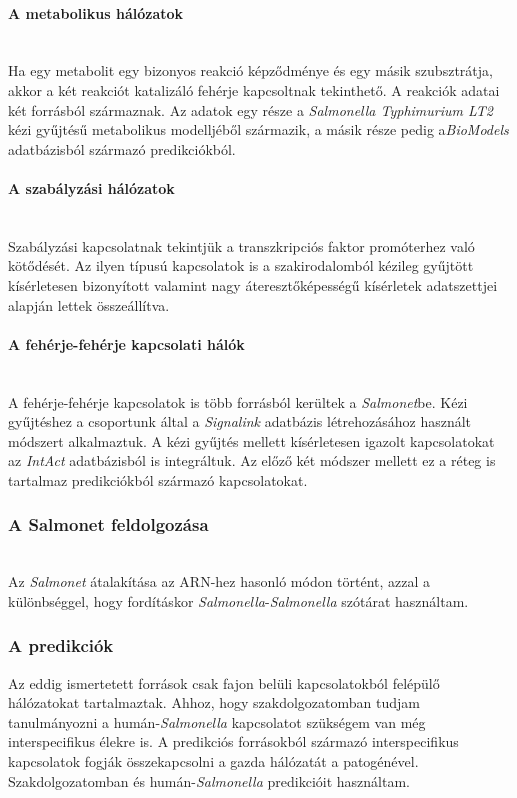\documentclass[a4paper,12pt]{article}
\begin{document}
			\paragraph{A metabolikus hálózatok} \mbox{}\\
				Ha egy metabolit egy bizonyos reakció képződménye és egy másik szubsztrátja, akkor a két reakciót katalizáló fehérje kapcsoltnak tekinthető. A reakciók adatai két forrásból származnak. Az adatok egy része a \textit{Salmonella Typhimurium LT2} kézi gyűjtésű metabolikus modelljéből származik, a másik része pedig a\textit{BioModels} adatbázisból származó predikciókból. \cite{salmonet}
				
			\paragraph{A szabályzási hálózatok} \mbox{}\\
				Szabályzási kapcsolatnak tekintjük a transzkripciós faktor promóterhez való kötődését. Az ilyen típusú kapcsolatok is a szakirodalomból kézileg gyűjtött kísérletesen bizonyított valamint nagy áteresztőképességű kísérletek adatszettjei alapján lettek összeállítva.  \cite{salmonet}
				
			\paragraph{A fehérje-fehérje kapcsolati hálók} \mbox{}\\
				A fehérje-fehérje kapcsolatok is több forrásból kerültek a \textit{Salmonet}be. Kézi gyűjtéshez a csoportunk által a \textit{Signalink} adatbázis létrehozásához használt módszert alkalmaztuk. A kézi gyűjtés mellett kísérletesen igazolt kapcsolatokat az \textit{IntAct} adatbázisból is integráltuk. Az előző két módszer mellett ez a réteg is tartalmaz predikciókból származó kapcsolatokat. 
				\cite{salmonet}
			
			\subsubsection{A Salmonet feldolgozása} \mbox{}\\
			Az \textit{Salmonet} átalakítása az ARN-hez hasonló módon történt, azzal a különbséggel, hogy fordításkor \textit{Salmonella}-\textit{Salmonella} szótárat használtam.

			\subsubsection{A predikciók}
			Az eddig ismertetett források csak fajon belüli kapcsolatokból felépülő hálózatokat tartalmaztak. Ahhoz, hogy szakdolgozatomban tudjam tanulmányozni a humán-\textit{Salmonella} kapcsolatot szükségem van még interspecifikus élekre is. A predikciós forrásokból származó interspecifikus kapcsolatok fogják összekapcsolni a gazda hálózatát a patogénével. Szakdolgozatomban \cite{Krishnadev} és \cite{Kshirsagar} humán-\textit{Salmonella} predikcióit használtam.
			
\end{document}
